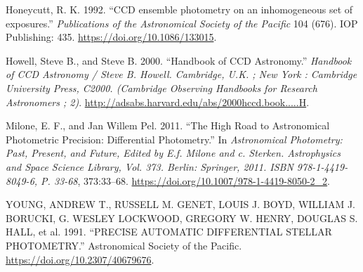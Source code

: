 \documentclass[]{elsarticle} %
\begin{document}
\leavevmode\hypertarget{ref-Honeycutt1992}{}%
Honeycutt, R. K. 1992. ``CCD ensemble photometry on an inhomogeneous set
of exposures.'' \emph{Publications of the Astronomical Society of the
Pacific} 104 (676). IOP Publishing: 435.
\url{https://doi.org/10.1086/133015}.

\leavevmode\hypertarget{ref-Howell2000}{}%
Howell, Steve B., and Steve B. 2000. ``Handbook of CCD Astronomy.''
\emph{Handbook of CCD Astronomy / Steve B. Howell. Cambridge, U.K. ; New
York : Cambridge University Press, C2000. (Cambridge Observing Handbooks
for Research Astronomers ; 2)}.
\url{http://adsabs.harvard.edu/abs/2000hccd.book.....H}.

\leavevmode\hypertarget{ref-Milone2011}{}%
Milone, E. F., and Jan Willem Pel. 2011. ``The High Road to Astronomical
Photometric Precision: Differential Photometry.'' In \emph{Astronomical
Photometry: Past, Present, and Future, Edited by E.f. Milone and c.
Sterken. Astrophysics and Space Science Library, Vol. 373. Berlin:
Springer, 2011. ISBN 978-1-4419-8049-6, P. 33-68}, 373:33--68.
\url{https://doi.org/10.1007/978-1-4419-8050-2_2}.

\leavevmode\hypertarget{ref-YOUNG1991}{}%
YOUNG, ANDREW T., RUSSELL M. GENET, LOUIS J. BOYD, WILLIAM J. BORUCKI,
G. WESLEY LOCKWOOD, GREGORY W. HENRY, DOUGLAS S. HALL, et al. 1991.
``PRECISE AUTOMATIC DIFFERENTIAL STELLAR PHOTOMETRY.'' Astronomical
Society of the Pacific. \url{https://doi.org/10.2307/40679676}.
\end{document}
